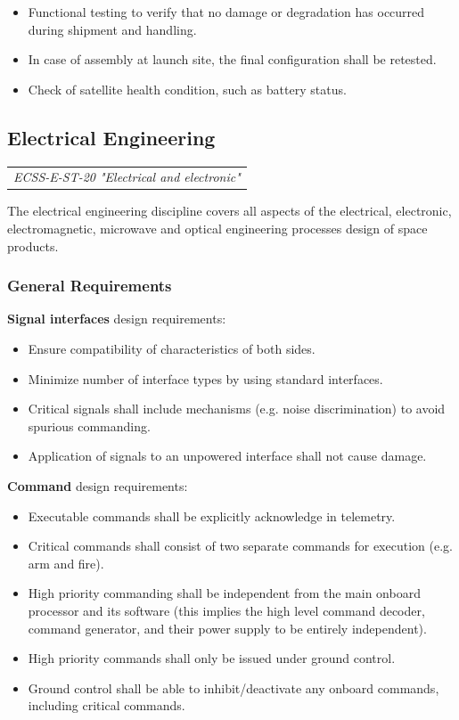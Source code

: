 \begin{itemize}
\item Functional testing to verify that no damage or degradation has occurred during shipment and handling.
\item In case of assembly at launch site, the final configuration shall be retested.
\item Check of satellite health condition, such as battery status.
\end{itemize}

\subsection{Electrical Engineering}

\begin{tabular}{l}
\textit{ECSS-E-ST-20 "Electrical and electronic" \cite{ECSS-E-ST-20}}
\end{tabular}

The electrical engineering discipline covers all aspects of the electrical, electronic, electromagnetic, microwave and optical engineering processes design of space products. 

\subsubsection{General Requirements}

\textbf{Signal interfaces} design requirements:

\begin{itemize}
\item Ensure compatibility of characteristics of both sides.
\item Minimize number of interface types by using standard interfaces.
\item Critical signals shall include mechanisms (e.g. noise discrimination) to avoid spurious commanding.
\item Application of signals to an unpowered interface shall not cause damage.
\end{itemize}

\textbf{Command} design requirements:

\begin{itemize}
\item Executable commands shall be explicitly acknowledge in telemetry.
\item Critical commands shall consist of two separate commands for execution (e.g. arm and fire).
\item High priority commanding shall be independent from the main onboard processor and its software (this implies the high level command decoder, command generator, and their power supply to be entirely independent).
\item High priority commands shall only be issued under ground control.
\item Ground control shall be able to inhibit/deactivate any onboard commands, including critical commands.
\end{itemize}


